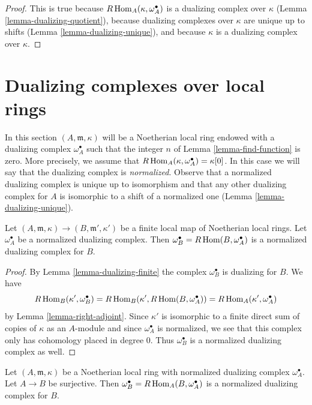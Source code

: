 \begin{proof}
This is true because $R\mathop{\mathrm{Hom}}\nolimits_A(\kappa, \omega_A^\bullet)$ is a dualizing
complex over $\kappa$ (Lemma \ref{lemma-dualizing-quotient}),
because dualizing complexes over $\kappa$ are unique up to shifts
(Lemma \ref{lemma-dualizing-unique}), and because $\kappa$ is a
dualizing complex over $\kappa$.
\end{proof}




\section{Dualizing complexes over local rings}
\label{section-dualizing-local}

\noindent
In this section $(A, \mathfrak m, \kappa)$ will be a Noetherian local
ring endowed with a dualizing complex $\omega_A^\bullet$ such that
the integer $n$ of Lemma \ref{lemma-find-function} is zero.
More precisely, we assume that $R\mathop{\mathrm{Hom}}\nolimits_A(\kappa, \omega_A^\bullet) = \kappa[0]$.
In this case we will say that the dualizing complex is {\it normalized}.
Observe that a normalized dualizing complex is unique up to
isomorphism and that any other dualizing complex for $A$ is isomorphic
to a shift of a normalized one (Lemma \ref{lemma-dualizing-unique}).

\begin{lemma}
\label{lemma-normalized-finite}
Let $(A, \mathfrak m, \kappa) \to (B, \mathfrak m', \kappa')$
be a finite local map of Noetherian local rings. Let $\omega_A^\bullet$
be a normalized dualizing complex. Then
$\omega_B^\bullet = R\mathop{\mathrm{Hom}}\nolimits(B, \omega_A^\bullet)$ is a
normalized dualizing complex for $B$.
\end{lemma}

\begin{proof}
By Lemma \ref{lemma-dualizing-finite} the complex
$\omega_B^\bullet$ is dualizing for $B$. We have
$$
R\mathop{\mathrm{Hom}}\nolimits_B(\kappa', \omega_B^\bullet) =
R\mathop{\mathrm{Hom}}\nolimits_B(\kappa', R\mathop{\mathrm{Hom}}\nolimits(B, \omega_A^\bullet)) =
R\mathop{\mathrm{Hom}}\nolimits_A(\kappa', \omega_A^\bullet)
$$
by Lemma \ref{lemma-right-adjoint}. Since $\kappa'$ is isomorphic
to a finite direct sum of copies of $\kappa$ as an $A$-module
and since $\omega_A^\bullet$ is normalized, we
see that this complex only has cohomology placed in degree $0$.
Thus $\omega_B^\bullet$ is a normalized dualizing complex as well.
\end{proof}

\begin{lemma}
\label{lemma-normalized-quotient}
Let $(A, \mathfrak m, \kappa)$ be a Noetherian local
ring with normalized dualizing complex $\omega_A^\bullet$.
Let $A \to B$ be surjective. Then
$\omega_B^\bullet = R\mathop{\mathrm{Hom}}\nolimits_A(B, \omega_A^\bullet)$ is a
normalized dualizing complex for $B$.
\end{lemma}

